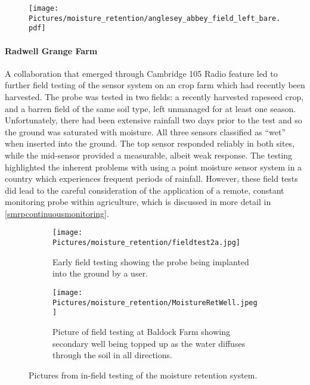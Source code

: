 \begin{figure}
	\centerline{\texttt{[image: Pictures/moisture\_retention/anglesey\_abbey\_field\_left\_bare.pdf]}}
	\captionsetup{justification = centering}
	\label{fangleseyabbeyleftbare}
\end{figure}


\paragraph{Radwell Grange Farm}
A collaboration that emerged through Cambridge 105 Radio feature led to further field testing of the sensor system on an crop farm which had recently been harvested. The probe was tested in two fields: a recently harvested rapeseed crop, and a barren field of the same soil type, left unmanaged for at least one season. Unfortunately, there had been extensive rainfall two days prior to the test and so the ground was saturated with moisture. All three sensors classified as ``wet'' when inserted into the ground. The top sensor responded reliably in both sites, while the mid-sensor provided a measurable, albeit weak response. The testing highlighted the inherent problems with using a point moisture sensor system in a country which experiences frequent periods of rainfall. However, these field tests did lead to the careful consideration of the application of a remote, constant monitoring probe within agriculture, which is discussed in more detail in \cref{smrpcontinuousmonitoring}.\\


\begin{figure}[H]
\centering
\begin{subfigure}[t]{0.35\textwidth}
\centering
	\texttt{[image: Pictures/moisture\_retention/fieldtest2a.jpg]}
	\captionsetup{justification = centering}
	\caption{Early field testing showing the probe being implanted into the ground by a user.}
	\label{ffieldtest2a}
\end{subfigure}
\begin{subfigure}[t]{0.5\textwidth}
\centering
	\texttt{[image: Pictures/moisture\_retention/MoistureRetWell.jpeg]}
	\captionsetup{justification = centering}
	\caption{Picture of field testing at Baldock Farm showing secondary well being topped up as the water diffuses through the soil in all directions.}
	\label{ffieldtest2b}
\end{subfigure}
\caption{Pictures from in-field testing of the moisture retention system.}
\end{figure}



